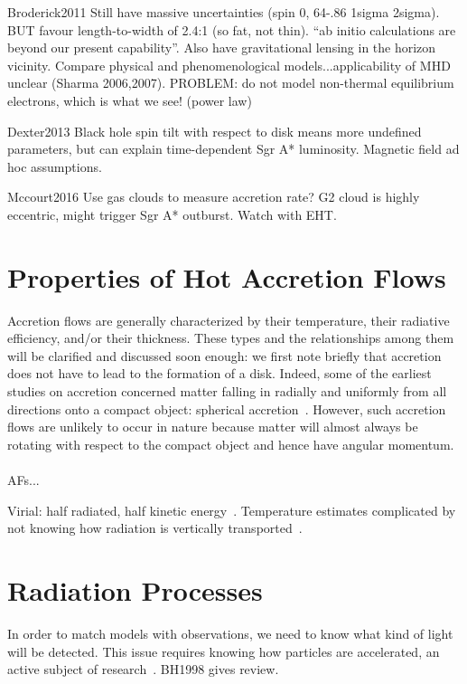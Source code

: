 Broderick2011
Still have massive uncertainties (spin 0, 64-.86 1sigma 2sigma). BUT favour length-to-width of 2.4:1 (so fat, not thin). ``ab initio calculations are beyond our present capability''. Also have gravitational lensing in the horizon vicinity. Compare physical and phenomenological models...applicability of MHD unclear (Sharma 2006,2007). PROBLEM: do not model non-thermal equilibrium electrons, which is what we see! (power law)


Dexter2013
Black hole spin tilt with respect to disk means more undefined parameters, but can explain time-dependent Sgr A* luminosity. Magnetic field ad hoc assumptions.

Mccourt2016
Use gas clouds to measure accretion rate? G2 cloud is highly eccentric, might trigger Sgr A* outburst. Watch with EHT.

\section{Properties of Hot Accretion Flows} \label{sec:propertiesAF}
Accretion flows are generally characterized by their temperature, their radiative efficiency, and/or their thickness. These types and the relationships among them will be clarified and discussed soon enough: we first note briefly that accretion does not have to lead to the formation of a disk. Indeed, some of the earliest studies on accretion concerned matter falling in radially and uniformly from all directions onto a compact object: spherical accretion~\cite{Bondi?XX}. However, such accretion flows are unlikely to occur in nature because matter will almost always be rotating with respect to the compact object and hence have angular momentum. \\
\\
AFs...

Virial: half radiated, half kinetic energy~\cite{BH1998}.
Temperature estimates complicated by not knowing how radiation is vertically transported~\cite{BH1998}. 



\section{Radiation Processes}
In order to match models with observations, we need to know what kind of light will be detected. This issue requires knowing how particles are accelerated, an active subject of research~\cite{XXXXXXX}. BH1998 gives review. 


